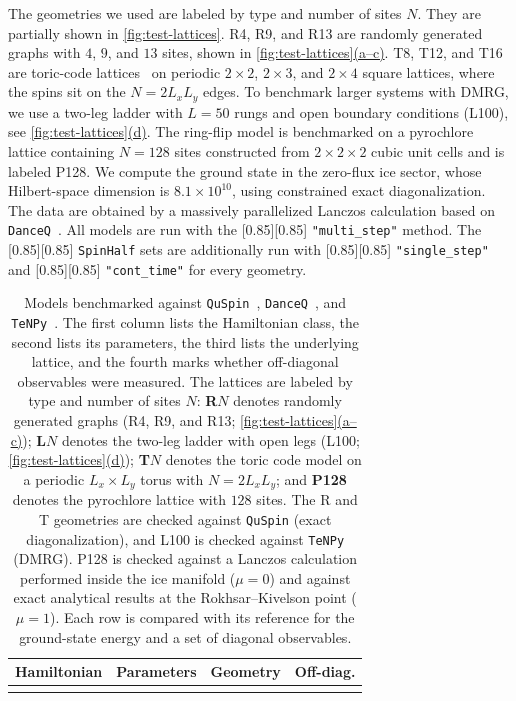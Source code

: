 \documentclass{SciPost}
\newcommand{\pyinline}[1]{\begingroup\setlength{\fboxsep}{0pt}%
  \colorbox{gray!15}{\raisebox{0pt}[0.85\ht\strutbox][0.85\dp\strutbox]{%
    \hspace{1pt}\lstinline{#1}\hspace{1pt}}}\endgroup}
\newcommand{\tablefontsize}{\footnotesize}
\newcommand{\figref}[2]{\hyperref[#1]{\autoref*{#1}(#2)}}
\begin{document}
The geometries we used are labeled by type and number of sites $N$.
%
They are partially shown in \autoref{fig:test-lattices}.
%
R4, R9, and R13 are randomly generated graphs with $4$, $9$, and $13$ sites, shown in \figref{fig:test-lattices}{a--c}.
%
T8, T12, and T16 are toric-code lattices~\cite{kitaev_fault_2003} on periodic $2\times2$, $2\times3$, and $2\times4$ square lattices, where the spins sit on the $N=2L_xL_y$ edges.
%
To benchmark larger systems with DMRG, we use a two-leg ladder with $L=50$ rungs and open boundary conditions (L100), see \figref{fig:test-lattices}{d}.
%
The ring-flip model is benchmarked on a pyrochlore lattice containing $N=128$ sites constructed from $2\times2\times2$ cubic unit cells and is labeled P128.
%
We compute the ground state in the zero-flux ice sector, whose Hilbert-space dimension is $8.1\times10^{10}$, using constrained exact diagonalization.
%
The data are obtained by a massively parallelized Lanczos calculation based on \texttt{DanceQ}~\cite{schaefer_danceQ_2025,DanceQ_code}.
%
All models are run with the \pyinline{"multi_step"} method.
%
The \pyinline{SpinHalf} sets are additionally run with \pyinline{"single_step"} and \pyinline{"cont_time"} for every geometry.


\begin{table}[htbp]
\centering
\tablefontsize
\begin{tabular}{@{}l p{6.0cm} l c@{}}
\toprule
\textbf{Hamiltonian} & \textbf{Parameters} & \textbf{Geometry} & \textbf{Off-diag.} \\
\midrule
 \\
\bottomrule
\end{tabular}
\caption{
	Models benchmarked against \texttt{QuSpin}~\cite{weinberg_quspin_2017,weinberg_quspin_2019}, \texttt{DanceQ}~\cite{schaefer_danceQ_2025,DanceQ_code}, and \texttt{TeNPy}~\cite{tenpy2024}.
	The first column lists the Hamiltonian class, the second lists its parameters, the third lists the underlying lattice, and the fourth marks whether off-diagonal observables were measured.
	The lattices are labeled by type and number of sites $N$: \textbf{R$N$} denotes randomly generated graphs (R4, R9, and R13; \figref{fig:test-lattices}{a--c}); \textbf{L$N$} denotes the two-leg ladder with open legs (L100; \figref{fig:test-lattices}{d}); \textbf{T$N$} denotes the toric code model on a periodic $L_x\times L_y$ torus with $N=2L_xL_y$; and \textbf{P128} denotes the pyrochlore lattice with $128$ sites.
	The R and T geometries are checked against \texttt{QuSpin} (exact diagonalization), and L100 is checked against \texttt{TeNPy} (DMRG).
	P128 is checked against a Lanczos calculation performed inside the ice manifold ($\mu=0$) and against exact analytical results at the Rokhsar--Kivelson point ($\mu=1$).
	Each row is compared with its reference for the ground-state energy and a set of diagonal observables.
	}
\label{tab:validation-models}
\end{table}
\end{document}
